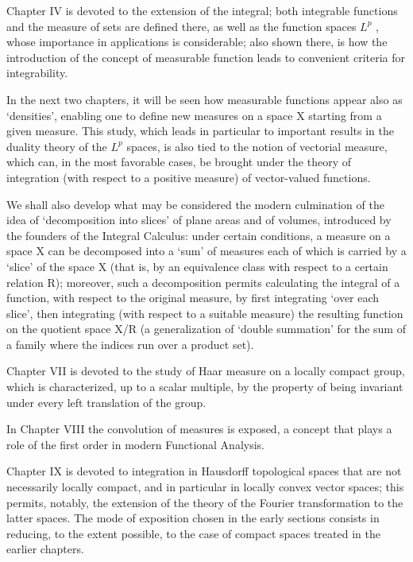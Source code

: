 Chapter IV is devoted to the extension of the integral; both integrable functions and the measure of sets are defined there, as well as the function spaces \(L^{p}\) , whose importance in applications is considerable; also shown there, is how the introduction of the concept of measurable function leads to convenient criteria for integrability.

In the next two chapters, it will be seen how measurable functions appear also as `densities', enabling one to define new measures on a space X starting from a given measure. This study, which leads in particular to important results in the duality theory of the \(L^{p}\) spaces, is also tied to the notion of vectorial measure, which can, in the most favorable cases, be brought under the theory of integration (with respect to a positive measure) of vector-valued functions.

We shall also develop what may be considered the modern culmination of the idea of `decomposition into slices' of plane areas and of volumes, introduced by the founders of the Integral Calculus: under certain conditions, a measure on a space X can be decomposed into a `sum' of measures each of which is carried by a `slice' of the space X (that is, by an equivalence class with respect to a certain relation R); moreover, such a decomposition permits calculating the integral of a function, with respect to the original measure, by first integrating `over each slice', then integrating (with respect to a suitable measure) the resulting function on the quotient space X/R (a generalization of `double summation' for the sum of a family where the indices run over a product set).

Chapter VII is devoted to the study of Haar measure on a locally compact group, which is characterized, up to a scalar multiple, by the property of being invariant under every left translation of the group.

In Chapter VIII the convolution of measures is exposed, a concept that plays a role of the first order in modern Functional Analysis.

Chapter IX is devoted to integration in Hausdorff topological spaces that are not necessarily locally compact, and in particular in locally convex vector spaces; this permits, notably, the extension of the theory of the Fourier transformation to the latter spaces. The mode of exposition chosen in the early sections consists in reducing, to the extent possible, to the case of compact spaces treated in the earlier chapters.

